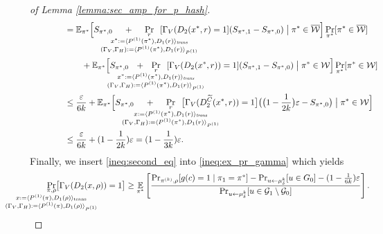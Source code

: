 \begin{proof}[of Lemma \ref{lemma:sec_amp_for_p_hash}]
\begin{align}
%
&\IndII = \mathbb{E}_{\pi^*}\Bigl[ S_{\pi^*,0}
\mkern23mu + \mkern23mu
\underset{
  \mathclap{
  \substack{r \\ x^* := \langle P^{(1)}(\pi^*), D_1(r) \rangle_{\mathit{trans}}
    \\ (\Gamma_V, \Gamma_H) := \langle P^{(1)}(\pi^*), D_1 (r) \rangle_{P^{(1)}} }}}
{\Pr}\mkern13mu[\Gamma_V(D_2(x^*, r) = 1]
  (S_{\pi^*,1} - S_{\pi^*,0}) \bigm| \pi^* \in \overline{\cW}\Bigr] \Pr_{\pi^*}[\pi^* \in \overline{\cW}]\notag\\
&\IndIII +  \mathbb{E}_{\pi^*}\Bigl[ S_{\pi^*,0} \mkern13mu + \mkern13mu
\underset{
  \mathclap{
  \substack{r \\ x^* := \langle P^{(1)}(\pi^*), D_1(r) \rangle_{\mathit{trans}}
    \\ (\Gamma_V, \Gamma_H) := \langle P^{(1)}(\pi^*), D_1 (r) \rangle_{P^{(1)}} }}}
{\Pr}\mkern13mu[\Gamma_V(D_2(x^*, r)) = 1]
(S_{\pi^*,1} - S_{\pi^*,0})  \bigm| \pi^* \in \cW\Bigr] \Pr_{\pi^*}[\pi^* \in \cW] \notag\\
&\IndII \leq \frac{\epsilon}{6k} + \mathbb{E}_{\pi^*}\Bigl[ S_{\pi^*,0} \mkern23mu + \mkern23mu
\underset{
  \mathclap{
  \substack{r \\ x := \langle P^{(1)}(\pi^*), D_1(r) \rangle_{\mathit{trans}}
    \\ (\Gamma_V, \Gamma_H) := \langle P^{(1)}(\pi^*), D_1 (r) \rangle_{P^{(1)}} }}}
{\Pr}\mkern13mu\big[\Gamma_V(D_2^{\widetilde{C}}(x^*, r)) = 1\big]
\big(\bigl(1 - \frac{1}{2k}\bigr)\epsilon - S_{\pi^*,0}\big)  \bigm| \pi^* \in \cW \Bigr] \notag\\
&\IndII \leq \frac{\epsilon}{6k} + (1 - \frac{1}{2k})\epsilon = (1 - \frac{1}{3k}) \epsilon.
\end{align}
Finally, we insert \eqref{ineq:second_eq} into \eqref{ineq:ex_pr_gamma} which yields
\begin{align*}
  \IndI
\underset{
  \mathclap{
  \substack{\pi, \rho \\ x := \langle P^{(1)}(\pi), D_1(\rho) \rangle_{\text{trans}}
    \\ (\Gamma_V, \Gamma_H) := \langle P^{(1)}(\pi), D_1 (\rho) \rangle_{P^{(1)}} }}}
{\Pr}\big[\Gamma_V(D_2(x, \rho)) = 1\big]
&\geq \underset{\pi^*}{\mathbb{E}}\left[\frac{{\Pr}_{\pi^{(k)}, \rho}[g(c) = 1 \mid \pi_1 = \pi^*] -
{\Pr}_{u \leftarrow \mu_{\delta}^{k}}[u \in G_0] - (1 - \frac{1}{6k})\epsilon} {\Pr_{u \leftarrow \mu_{\delta}^{k}}[u \in \cG_1 \setminus \cG_0]}\right] \notag.
 \end{align*}

\end{proof}
